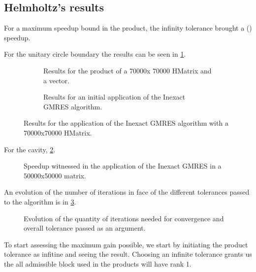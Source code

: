 \subsection{Helmholtz's results}

For a maximum speedup bound in the product, the infinity tolerance brought a () speedup.

For the unitary circle boundary the results can be seen in \ref{fig:Helmholtz_circle_results}.

\begin{figure}[h!]
    \centering
    \begin{subfigure}[b]{0.45\linewidth}
        
        \caption{Results for the product of a 70000x 70000 HMatrix and a vector.}
    \end{subfigure}
    \begin{subfigure}[b]{0.45\linewidth}
        
        \caption{Results for an initial application of the Inexact GMRES algorithm.}
    \end{subfigure}
    \caption{Results for the application of the Inexact GMRES algorithm with a 70000x70000 HMatrix.}
    \label{fig:Helmholtz_circle_results}
\end{figure}


For the cavity, \ref{fig:cavity_results}.

\begin{figure}[h!]
    \centering
    
    \caption{Speedup witnessed in the application of the Inexact GMRES in a 50000x50000 matrix.}
    \label{fig:cavity_results}
\end{figure}

An evolution of the number of iterations in face of the different tolerances passed to the algorithm is in \ref{fig:cavity_iterations}.

\begin{figure}[h!]
    \centering
    
    \caption{Evolution of the quantity of iterations needed for convergence and overall tolerance passed as an argument.}
    \label{fig:cavity_iterations}
\end{figure}



To start assessing the maximum gain possible, we start by initiating the product tolerance as infitine and seeing the result. Choosing an infinite tolerance grants us the all admissible block used in the products will have rank 1.


